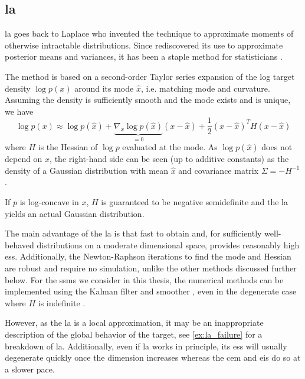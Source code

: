 \subsection{\texorpdfstring{\Acrfull{la}}{Laplace approximation}}

\acrfull{la} goes back to Laplace \cite{Laplace1986Memoir} who invented the technique to approximate moments of otherwise intractable distributions. Since \cite{Tierney1986Accurate,Tierney1989Fully} rediscovered its use to approximate posterior means and variances, it has been a staple method for statisticians .

The method is based on a second-order Taylor series expansion of the log target density $\log p(x)$ around its mode $\hat x$, i.e. matching mode and curvature. Assuming the density is sufficiently smooth and the mode exists and is unique, we have
$$
\log p(x) \approx \log p(\hat x) + \underbrace{\nabla_{x} \log p (\hat x)}_{= 0} \left( x - \hat x \right) + \frac{1}{2} (x - \hat x)^{T} H (x - \hat x)
$$
where $H$ is the Hessian of $\log p$ evaluated at the mode. As $\log p (\hat x)$ does not depend on $x$, the right-hand side can be seen (up to additive constants) as the density of a Gaussian distribution with mean $\hat x$ and covariance matrix $\Sigma = - H^{-1}$. 

If $p$ is log-concave in $x$, $H$ is guaranteed to be negative semidefinite and the \gls{la} yields an actual Gaussian distribution. 


The main advantage of the \gls{la} is that fast to obtain and, for sufficiently well-behaved distributions on a moderate dimensional space, provides reasonably high \gls{ess}. Additionally, the Newton-Raphson iterations to find the mode and Hessian are robust and require no simulation, unlike the other methods discussed further below.
For the \glspl{ssm} we consider in this thesis, the numerical methods can be implemented using the Kalman filter and smoother \cite{Shephard1997Likelihood,Durbin1997Monte}, even in the degenerate case where $H$ is indefinite \cite{Jungbacker2007Monte}.

However, as the \gls{la} is a local approximation, it may be an inappropriate description of the global behavior of the target, see \cref{ex:la_failure} for a breakdown of \gls{la}. 
Additionally, even if \gls{la} works in principle, its \gls{ess} will usually degenerate quickly once the dimension increases whereas the \gls{cem} and \gls{eis} do so at a slower pace.

